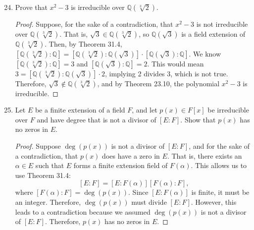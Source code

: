 \documentclass[12pt, oneside]{book}
\newcommand{\Q}{\mathbb{Q}}
\newcommand{\pf}[1]{
    \begin{customframedproof}[linecolor=orangehdx!75]
        \begin{proof}
        #1
        \end{proof}
    \end{customframedproof}
}
\begin{document}
\begin{enumerate}
	\setcounter{enumi}{23}
	\item Prove that \(x^{2} - 3\) is irreducible over \(\Q(\sqrt[3]{2})\).
	\pf{
		Suppose, for the sake of a contradiction, that \(x^{2} - 3\) is not irreducible over \(\Q(\sqrt[3]{2})\). That is, \(\sqrt{3} \in \Q(\sqrt[3]{2})\), so \(\Q(\sqrt{3})\) is a field extension of \(\Q(\sqrt[3]{2})\). Then, by Theorem 31.4, \([\Q(\sqrt[3]{2}) : \Q] = [\Q(\sqrt[3]{2}) : \Q(\sqrt{3})] \cdot [\Q(\sqrt{3}) : \Q]\). We know \([\Q(\sqrt[3]{2}) : \Q] = 3\) and \([\Q(\sqrt{3}) : \Q] = 2\). This would mean \(3 = [\Q(\sqrt[3]{2}) : \Q(\sqrt{3})] \cdot 2\), implying 2 divides 3, which is not true. Therefore, \(\sqrt{3} \notin \Q(\sqrt[3]{2})\), and by Theorem 23.10, the polynomial \(x^{2} - 3\) is irreducible.
	}

	\setcounter{enumi}{28}

	\item Let \(E\) be a finite extension of a field \(F\), and let \(p(x) \in F[x]\) be irreducible over \(F\) and have degree that is not a divisor of \([E : F]\). Show that \(p(x)\) has no zeros in \(E\).
	\pf{
		Suppose \(\deg(p(x))\) is not a divisor of \([E : F]\), and for the sake of a contradiction, that \(p(x)\) does have a zero in \(E\). That is, there exists an \(\alpha \in E\) such that \(E\) forms a finite extension field of \(F(\alpha)\). This allows us to use Theorem 31.4:
		\[
			[E : F] = [E : F(\alpha)][F(\alpha) : F],
		\]
		where \([F(\alpha) : F] = \deg(p(x))\). Since \([E : F(\alpha)]\) is finite, it must be an integer. Therefore, \(\deg(p(x))\) must divide \([E : F]\). However, this leads to a contradiction because we assumed \(\deg(p(x))\) is not a divisor of \([E : F]\). Therefore, \(p(x)\) has no zeros in \(E\).
	}

\end{enumerate}


\end{document}
